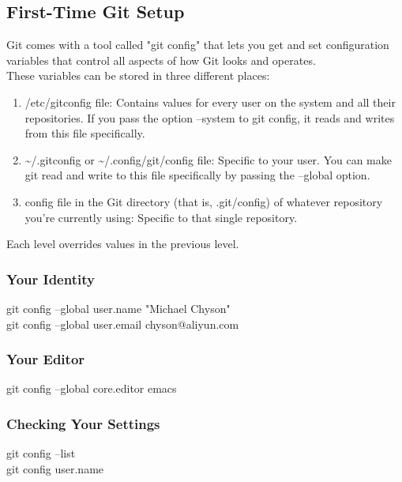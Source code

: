 \documentclass[11pt]{article}
\begin{document}
\subsection{First-Time Git Setup}
\label{sec:org94c77e6}
Git comes with a tool called "git config" that lets you get and set configuration variables that control all aspects of how Git looks and operates.\\
These variables can be stored in three different places:\\
\begin{enumerate}
\item /etc/gitconfig file: Contains values for every user on the system and all their repositories. If you pass the option --system to git config, it reads and writes from this file specifically.\\
\item \textasciitilde{}/.gitconfig or \textasciitilde{}/.config/git/config file: Specific to your user. You can make git read and write to this file specifically by passing the --global option.\\
\item config file in the Git directory (that is, .git/config) of whatever repository you're currently using: Specific to that single repository.\\
\end{enumerate}

Each level overrides values in the previous level.\\

\subsubsection{Your Identity}
\label{sec:org2e85862}
git config --global user.name "Michael Chyson"\\
git config --global user.email chyson@aliyun.com\\

\subsubsection{Your Editor}
\label{sec:orgf15ba56}
git config --global core.editor emacs\\

\subsubsection{Checking Your Settings}
\label{sec:org2a169d4}
git config --list\\
git config user.name\\
\end{document}

